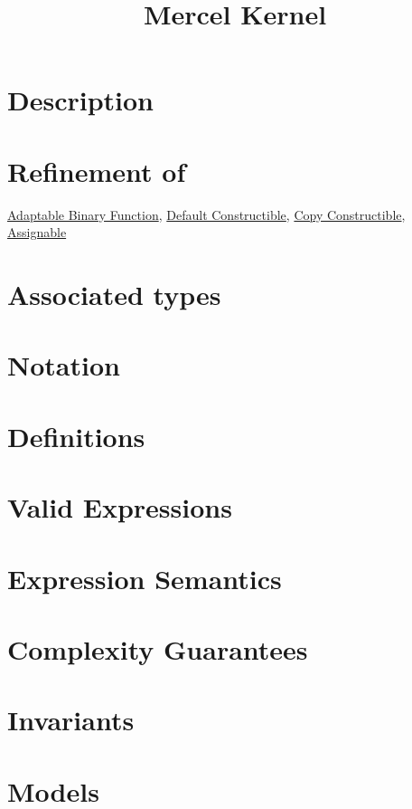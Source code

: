 \documentclass{article}
\begin{document}
\title{Mercel Kernel}
\maketitle


\section*{Description}
\section*{Refinement of}

\href{http://www.sgi.com/tech/stl/AdaptableBinaryFunction.html}{Adaptable Binary Function}, 
\href{http://www.sgi.com/tech/stl/DefaultConstructible.html}{Default Constructible}, 
\href{http://www.boost.org/doc/html/CopyConstructible.html}{Copy Constructible},
\href{http://www.boost.org/doc/html/Assignable.html}{Assignable}

\section*{Associated types}

\section*{Notation}
\section*{Definitions}
\section*{Valid Expressions}
\section*{Expression Semantics}

\section*{Complexity Guarantees}

\section*{Invariants}

\section*{Models}
\end{document}
